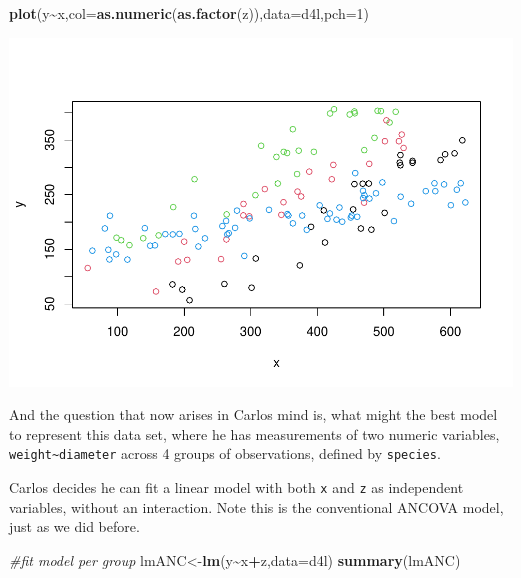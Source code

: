 \documentclass[
]{book}
\newenvironment{Shaded}{\begin{snugshade}}{\end{snugshade}}
\newcommand{\AttributeTok}[1]{\textcolor[rgb]{0.13,0.29,0.53}{#1}}
\newcommand{\CommentTok}[1]{\textcolor[rgb]{0.56,0.35,0.01}{\textit{#1}}}
\newcommand{\DecValTok}[1]{\textcolor[rgb]{0.00,0.00,0.81}{#1}}
\newcommand{\FunctionTok}[1]{\textcolor[rgb]{0.13,0.29,0.53}{\textbf{#1}}}
\newcommand{\NormalTok}[1]{#1}
\newcommand{\OtherTok}[1]{\textcolor[rgb]{0.56,0.35,0.01}{#1}}
\newcommand{\SpecialCharTok}[1]{\textcolor[rgb]{0.81,0.36,0.00}{\textbf{#1}}}
\begin{document}
\begin{Shaded}
\begin{Highlighting}[]
\FunctionTok{plot}\NormalTok{(y}\SpecialCharTok{\textasciitilde{}}\NormalTok{x,}\AttributeTok{col=}\FunctionTok{as.numeric}\NormalTok{(}\FunctionTok{as.factor}\NormalTok{(z)),}\AttributeTok{data=}\NormalTok{d4l,}\AttributeTok{pch=}\DecValTok{1}\NormalTok{)}
\end{Highlighting}
\end{Shaded}

\includegraphics{ECOMODbook_files/figure-latex/a11.20-1.pdf}

And the question that now arises in Carlos mind is, what might the best model to represent this data set, where he has measurements of two numeric variables, \texttt{weight\textasciitilde{}diameter} across 4 groups of observations, defined by \texttt{species}.

Carlos decides he can fit a linear model with both \texttt{x} and \texttt{z} as independent variables, without an interaction. Note this is the conventional ANCOVA model, just as we did before.

\begin{Shaded}
\begin{Highlighting}[]
\CommentTok{\#fit model per group}
\NormalTok{lmANC}\OtherTok{\textless{}{-}}\FunctionTok{lm}\NormalTok{(y}\SpecialCharTok{\textasciitilde{}}\NormalTok{x}\SpecialCharTok{+}\NormalTok{z,}\AttributeTok{data=}\NormalTok{d4l)}
\FunctionTok{summary}\NormalTok{(lmANC)}
\end{Highlighting}
\end{Shaded}
\end{document}
